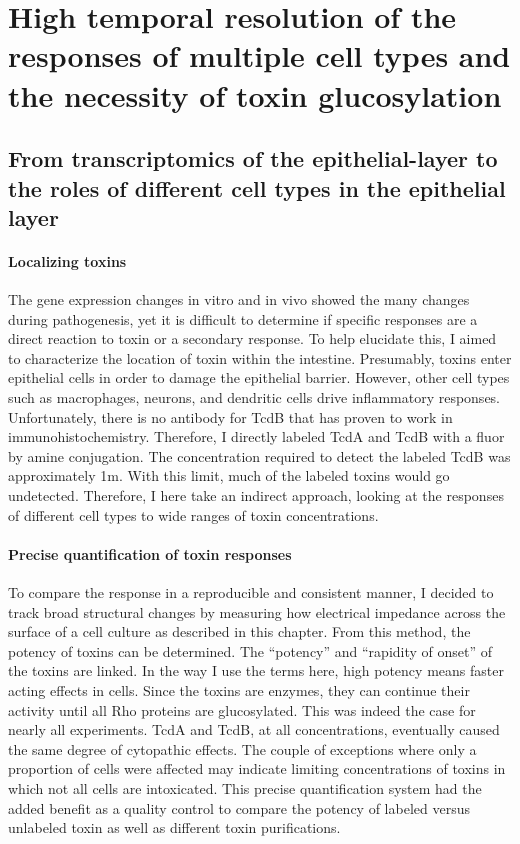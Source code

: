 \doublespacing

\chapter[Responses of multiple cell types]{ High temporal resolution 
           of the responses of multiple cell 
           types and the necessity of toxin glucosylation }\label{chapter:imp}


\section{From transcriptomics of the epithelial-layer to the roles
           of different cell types in the epithelial layer}

\subsubsection{Localizing toxins}
The gene expression changes in vitro and in vivo showed
the many changes during pathogenesis, yet it is difficult
to determine if specific responses are a direct
reaction to toxin or a secondary response.
To help elucidate this, I aimed to characterize the location
of toxin within the intestine.
Presumably, toxins enter
epithelial cells in order to damage the epithelial barrier.
However, other cell types such as macrophages, neurons, and dendritic cells
drive inflammatory responses. Unfortunately, there is no
antibody for TcdB that has proven to work in immunohistochemistry.
Therefore, I directly labeled TcdA and TcdB with a fluor by amine conjugation.
The concentration required to detect the labeled TcdB
was approximately 1\textmugreek{}m. With this limit, much
of the labeled toxins would go undetected. Therefore, I here take
an indirect approach, looking at the responses of different cell
types to wide ranges of toxin concentrations.

\subsubsection{Precise quantification of toxin responses}
To compare the response in a reproducible and consistent manner,
I decided to track broad structural changes by measuring how electrical
impedance across the surface of a cell culture as described in this chapter.
From this method, the potency of toxins can be determined.
The ``potency'' and ``rapidity of onset'' of the toxins are linked.
In the way I use the terms here, high potency means faster acting
effects in cells. Since the toxins are enzymes, they can continue
their activity until all Rho proteins are glucosylated. This was indeed
the case for nearly all experiments. TcdA and TcdB, at all concentrations,
eventually caused the same degree of cytopathic effects. The couple of exceptions
where only a proportion of cells were affected may
indicate limiting concentrations of toxins in which not all cells
are intoxicated.
This precise quantification system had the added benefit as a
quality control to compare the potency of labeled versus unlabeled toxin
as well as different toxin purifications.


